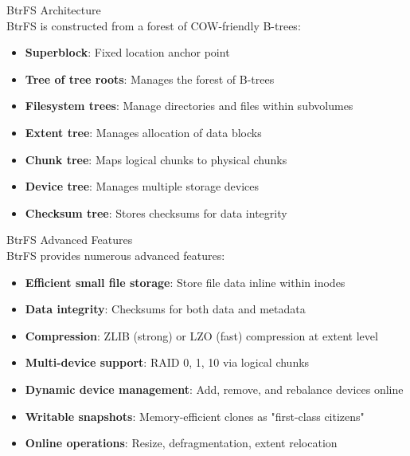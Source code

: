 \begin{definition}{BtrFS Architecture}\\
    BtrFS is constructed from a forest of COW-friendly B-trees:
    \begin{itemize}
        \item \textbf{Superblock}: Fixed location anchor point
        \item \textbf{Tree of tree roots}: Manages the forest of B-trees
        \item \textbf{Filesystem trees}: Manage directories and files within subvolumes
        \item \textbf{Extent tree}: Manages allocation of data blocks
        \item \textbf{Chunk tree}: Maps logical chunks to physical chunks
        \item \textbf{Device tree}: Manages multiple storage devices
        \item \textbf{Checksum tree}: Stores checksums for data integrity
    \end{itemize}
\end{definition}

\begin{definition}{BtrFS Advanced Features}\\
    BtrFS provides numerous advanced features:
    \begin{itemize}
        \item \textbf{Efficient small file storage}: Store file data inline within inodes
        \item \textbf{Data integrity}: Checksums for both data and metadata
        \item \textbf{Compression}: ZLIB (strong) or LZO (fast) compression at extent level
        \item \textbf{Multi-device support}: RAID 0, 1, 10 via logical chunks
        \item \textbf{Dynamic device management}: Add, remove, and rebalance devices online
        \item \textbf{Writable snapshots}: Memory-efficient clones as "first-class citizens"
        \item \textbf{Online operations}: Resize, defragmentation, extent relocation
    \end{itemize}
\end{definition}


